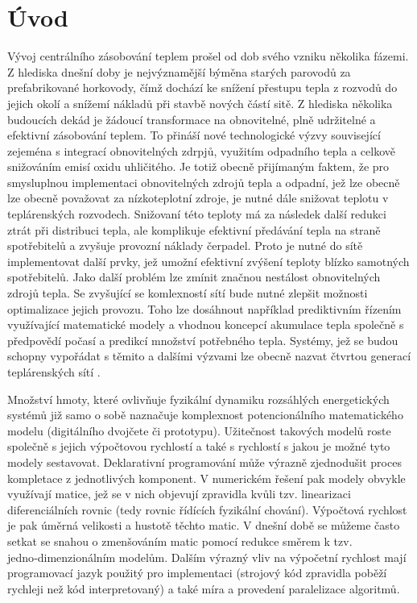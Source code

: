\chapter{Úvod}
Vývoj centrálního zásobování teplem prošel od dob svého vzniku několika fázemi.
Z hlediska dnešní doby je nejvýznamější býměna starých parovodů za
prefabrikované horkovody, čímž dochází ke snížení přestupu tepla z rozvodů do
jejich okolí a snížemí nákladů při stavbě nových částí sitě. Z hlediska
několika budoucích dekád je žádoucí transformace na obnovitelné, plně
udržitelné a efektivní zásobování teplem. To přináší nové technologické výzvy
související zejeména s integrací obnovitelných zdrpjů, využitím odpadního tepla
a celkově snižováním emisí oxidu uhličitého. Je totiž obecně přijímaným faktem,
že pro smysluplnou implementaci obnovitelných zdrojů tepla a odpadní, jež lze
obecně lze obecně považovat za nízkoteplotní zdroje, je nutné dále snižovat
teplotu v teplárenských rozvodech. Snižovaní této teploty má za následek další
redukci ztrát při distribuci tepla, ale komplikuje efektivní předávání tepla na
straně spotřebitelů a zvyšuje provozní náklady čerpadel. Proto je nutné do sítě
implementovat další prvky, jež umožní efektivní zvýšení teploty blízko
samotných spotřebitelů. Jako další problém lze zmínit značnou nestálost
obnovitelných zdrojů tepla. Se zvyšující se komlexností sítí bude nutné zlepšit
možnosti optimalizace jejich provozu. Toho lze dosáhnout například prediktivním
řízením využívající matematické modely a vhodnou koncepcí akumulace tepla
společně s předpovědí počasí a predikcí množství potřebného tepla. Systémy, jež
se budou schopny vypořádat s těmito a dalšími výzvami lze obecně nazvat čtvrtou
generací teplárenských sítí \cite{Lund2014}.

Množství hmoty, které ovlivňuje fyzikální dynamiku rozsáhlých energetických 
systémů již samo o sobě naznačuje komplexnost potencionálního matematického 
modelu (digitálního dvojčete či prototypu). Užitečnost takových modelů roste 
společně s jejich výpočtovou rychlostí a také s rychlostí s jakou je možné tyto 
modely sestavovat. Deklarativní programování může výrazně zjednodušit proces 
kompletace z jednotlivých komponent. V numerickém řešení pak modely obvykle 
využívají matice, jež se v nich objevují zpravidla kvůli tzv. linearizaci 
diferenciálních rovnic (tedy rovnic řídících fyzikální chování). Výpočtová 
rychlost je pak úměrná velikosti a hustotě těchto matic. V dnešní době se 
můžeme často setkat se snahou o zmenšováním matic pomocí redukce směrem k tzv.
jedno‑dimenzionálním modelům. Dalším výrazný vliv na výpočetní rychlost mají
programovací jazyk použitý pro implementaci (strojový kód zpravidla poběží 
rychleji než kód interpretovaný) a také míra a provedení paralelizace
algoritmů.

